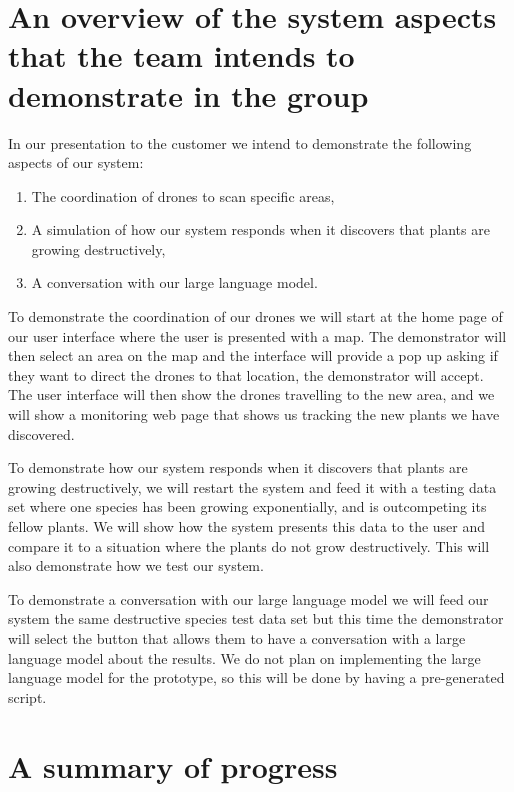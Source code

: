\documentclass{article}
\begin{document}
\section{An overview of the system aspects that the team intends to demonstrate in the group}

In our presentation to the customer we intend to demonstrate the following aspects of our system:
\begin{enumerate}[noitemsep,topsep=3pt]
    \item The coordination of drones to scan specific areas,
    \item A simulation of how our system responds when it discovers that plants are growing destructively,
    \item A conversation with our large language model.
\end{enumerate}

To demonstrate the coordination of our drones we will start at the home page of our user interface where the user is presented with a map. 
The demonstrator will then select an area on the map and the interface will provide a pop up asking if they want to direct the drones to that location, the demonstrator will accept.
The user interface will then show the drones travelling to the new area, and we will show a monitoring web page that shows us tracking the new plants we have discovered.

To demonstrate how our system responds when it discovers that plants are growing destructively, we will restart the system and feed it with a testing data set where one species has been growing exponentially, and is outcompeting its fellow plants.
We will show how the system presents this data to the user and compare it to a situation where the plants do not grow destructively.
This will also demonstrate how we test our system.

To demonstrate a conversation with our large language model we will feed our system the same destructive species test data set but this time the demonstrator will select the button that allows them to have a conversation with a large language model about the results.
We do not plan on implementing the large language model for the prototype, so this will be done by having a pre-generated script.



\section{A summary of progress}
\end{document}
